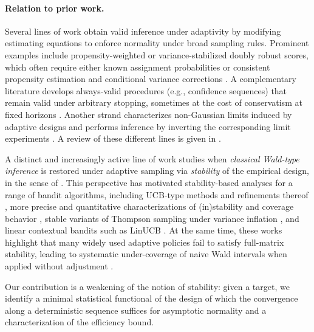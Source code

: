 \documentclass[11pt]{article}
\begin{document}
\paragraph{Relation to prior work.}
Several lines of work obtain valid inference under adaptivity by modifying estimating
equations to enforce normality under broad sampling rules. Prominent examples include
propensity-weighted or variance-stabilized doubly robust scores, which often require either
known assignment probabilities or consistent propensity estimation and conditional variance
corrections \citep[e.g.,][]{hadad2021confidence, bibaut2021post, zhang2021statistical}.
A complementary literature develops always-valid procedures (e.g., confidence sequences)
that remain valid under arbitrary stopping, sometimes at the cost of conservatism at fixed
horizons \citep{howard2021time_uniform, waudby_smith2021tu_clt, bibaut2022near}.
Another strand characterizes non-Gaussian limits induced by adaptive designs and performs
inference by inverting the corresponding limit experiments \citep{rosenberger1999bootstrap,
hirano2023asymptotic, adusumilli2023optimal, cho2025simulationadaptive}. A review of these different lines is given in \citep{bibaut2025demystifying}.

A distinct and increasingly active line of work studies when \emph{classical Wald-type inference}
is restored under adaptive sampling via \emph{stability} of the empirical design, in the sense of
\citet{laiweiaos1982}. This perspective has motivated stability-based analyses for a
range of bandit algorithms, including UCB-type methods and refinements thereof
\citep{kalvit2021closer, khamaru2024inference, fan2022typical, han2024ucbalgorithmsmultiarmedbandits},
more precise and quantitative characterizations of (in)stability and coverage behavior
\citep{fan2024precise, han2026thompson}, stable variants of Thompson sampling under variance inflation
\citep{halder2025stablethompsonsamplingvalid}, and linear contextual bandits such as LinUCB
\citep{fan2025statisticalinferenceadaptivesampling}. At the same time, these works highlight that
many widely used adaptive policies fail to satisfy full-matrix stability, leading to systematic
under-coverage of naive Wald intervals when applied without adjustment
\citep{fan2024precise}.

Our contribution is a weakening of the notion of stability: given a target, we identify a minimal statistical functional of the design of which the convergence along a deterministic sequence suffices for asymptotic normality and a characterization of the efficiency bound.
\end{document}
